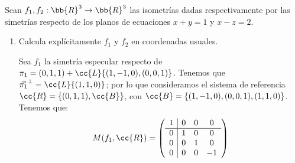 \begin{ejercicio}
    Sean $f_1, f_2 : \bb{R}^3\to \bb{R}^3$ las isometrías dadas respectivamente por las simetrías respecto de los planos de ecuaciones $x + y = 1$ y $x - z = 2$.
    \begin{enumerate}
        \item Calcula explícitamente $f_1$ y $f_2$ en coordenadas usuales.

        Sea $f_1$ la simetría especular respecto de $\pi_1=(0,1,1) + \cc{L}\{(1,-1,0), (0,0,1)\}$. Tenemos que $\vec{\pi_1}^\perp = \cc{L}\{(1,1,0)\}$; por lo que consideramos el sistema de referencia $\cc{R}=\{(0,1,1), \cc{B}\}$, con $\cc{B}=\{(1,-1,0), (0,0,1), (1,1,0)\}$. Tenemos que:
        \begin{equation*}
            M(f_1,\cc{R}) = \left(
            \begin{array}{c|ccc}
                1 & 0 & 0 & 0 \\ \hline
                0 & 1 & 0 & 0 \\
                0 & 0 & 1 & 0 \\
                0 & 0 & 0 & -1
            \end{array}
            \right)
        \end{equation*}


\end{enumerate}
\end{ejercicio}
